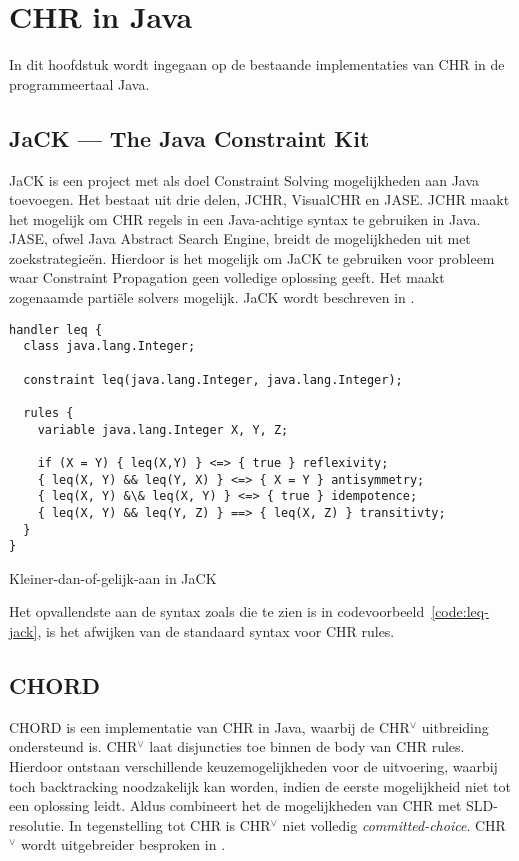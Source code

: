 \chapter{CHR in Java} \label{chap:chr-java}

In dit hoofdstuk wordt ingegaan op de bestaande implementaties van CHR in de programmeertaal Java. 

\section{JaCK --- The Java Constraint Kit}

JaCK is een project met als doel Constraint Solving mogelijkheden aan Java toevoegen. Het bestaat uit drie delen, JCHR, VisualCHR en JASE. JCHR maakt het mogelijk om CHR regels in een Java-achtige syntax te gebruiken in Java. JASE, ofwel Java Abstract Search Engine, breidt de mogelijkheden uit met zoekstrategie\"en. Hierdoor is het mogelijk om JaCK te gebruiken voor probleem waar Constraint Propagation geen volledige oplossing geeft. Het maakt zogenaamde parti\"ele solvers mogelijk. JaCK wordt beschreven in \cite{jack}.
\begin{exCode}[bhp]
\begin{Verbatim}[frame=single]
handler leq {
  class java.lang.Integer;
  
  constraint leq(java.lang.Integer, java.lang.Integer);
  
  rules {
    variable java.lang.Integer X, Y, Z;
    
    if (X = Y) { leq(X,Y) } <=> { true } reflexivity;
    { leq(X, Y) && leq(Y, X) } <=> { X = Y } antisymmetry;
    { leq(X, Y) &\& leq(X, Y) } <=> { true } idempotence;
    { leq(X, Y) && leq(Y, Z) } ==> { leq(X, Z) } transitivty;
  }
}
\end{Verbatim}
\caption{Kleiner-dan-of-gelijk-aan in JaCK}
\label{code:leq-jack}
\end{exCode}
Het opvallendste aan de syntax zoals die te zien is in codevoorbeeld~\ref{code:leq-jack}, is het afwijken van de standaard syntax voor CHR rules.

\section{CHORD}

CHORD\cite{chord} is een implementatie van CHR in Java, waarbij de CHR$^\vee$ uitbreiding ondersteund is. CHR$^\vee$ laat disjuncties toe binnen de body van CHR rules. Hierdoor ontstaan verschillende keuzemogelijkheden voor de uitvoering, waarbij toch backtracking noodzakelijk kan worden, indien de eerste mogelijkheid niet tot een oplossing leidt. Aldus combineert het de mogelijkheden van CHR met SLD-resolutie. In tegenstelling tot CHR is CHR$^\vee$ niet volledig {\em committed-choice}. CHR$^\vee$ wordt uitgebreider besproken in \cite{chrv}.

